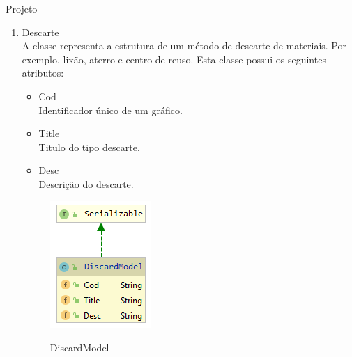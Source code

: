 \documentclass[
	12pt,				%
	openany,			%
	twoside,			%
	a4paper,			%
	english,			%
	french,				%
	spanish,			%
	brazil				%
	]{abntex2}
\begin{document}
\begin{chapter}{Projeto}
\begin{enumerate}
  \item{Descarte}   \\ A classe \textit{} representa a estrutura de um método de descarte de materiais. Por exemplo, lixão, aterro e centro de reuso. Esta classe possui os seguintes atributos:
  
  \begin{itemize}
  \item{Cod}\\ Identificador único de um gráfico.
       \item{Title}\\Titulo do tipo descarte.
         \item{Desc}\\ Descrição do descarte.
  
    
\end{itemize}
  
\begin{figure}[h]
\centering
   \caption{DiscardModel}
   \includegraphics[scale=1.0]{media/discardModel.png}
     \label{fig:discardModel}
\end{figure}


\end{enumerate}
\end{chapter}
\end{document}
